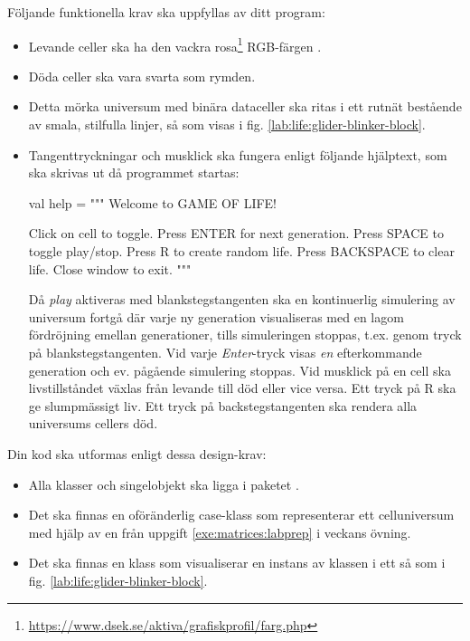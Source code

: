 Följande funktionella krav ska uppfyllas av ditt program:
\begin{itemize}[nosep, label={$\square$},]
\item Levande celler ska ha den vackra rosa\footnote{\url{https://www.dsek.se/aktiva/grafiskprofil/farg.php}} RGB-färgen .
\item Döda celler ska vara svarta som rymden.
\item Detta mörka universum med binära dataceller ska ritas i ett rutnät bestående av smala, stilfulla linjer, så som visas i fig. \ref{lab:life:glider-blinker-block}.
\item Tangenttryckningar och musklick ska fungera enligt följande hjälptext, som ska skrivas ut då programmet startas:
\begin{CodeSmall}
  val help = """
    Welcome to GAME OF LIFE!

    Click on cell to toggle.
    Press ENTER for next generation.
    Press SPACE to toggle play/stop.
    Press R to create random life.
    Press BACKSPACE to clear life.
    Close window to exit.
  """
\end{CodeSmall}
Då \emph{play} aktiveras med blankstegstangenten ska en kontinuerlig simulering av universum fortgå där varje ny generation visualiseras med en lagom fördröjning emellan generationer, tills simuleringen stoppas, t.ex. genom tryck på blankstegstangenten. Vid varje \emph{Enter}-tryck visas \emph{en} efterkommande generation och ev. pågående simulering stoppas. Vid musklick på en cell ska livstillståndet växlas från levande till död eller vice versa. Ett tryck på R ska ge slumpmässigt liv. Ett tryck på backstegstangenten ska rendera alla universums cellers död.

\end{itemize}

\vspace{1em}\noindent Din kod ska utformas enligt dessa design-krav:
\begin{itemize}[nosep, label={$\square$}]
\item Alla klasser och singelobjekt ska ligga i paketet .
\item Det ska finnas en oföränderlig case-klass  som representerar ett celluniversum med hjälp av en  från uppgift \ref{exe:matrices:labprep} i veckans övning.
\item Det ska finnas en klass  som visualiserar en  instans av klassen  i ett   så som i fig. \ref{lab:life:glider-blinker-block}.
\end{itemize}


